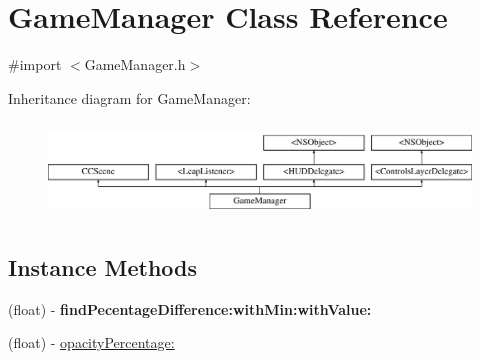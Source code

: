 \hypertarget{interface_game_manager}{\section{Game\-Manager Class Reference}
\label{d4/d94/interface_game_manager}
}


{\ttfamily \#import $<$Game\-Manager.\-h$>$}

Inheritance diagram for Game\-Manager\-:\begin{figure}[H]
\begin{center}
\leavevmode
\includegraphics[height=2.560976cm]{d4/d94/interface_game_manager}
\end{center}
\end{figure}
\subsection*{Instance Methods}
\begin{DoxyCompactItemize}
\item 
\hypertarget{interface_game_manager_a7071b8391346173da0beeac17ea27310}{(float) -\/ {\bfseries find\-Pecentage\-Difference\-:with\-Min\-:with\-Value\-:}}\label{d4/d94/interface_game_manager_a7071b8391346173da0beeac17ea27310}

\item 
(float) -\/ \hyperlink{interface_game_manager_a0acb835edfa002c4c66a92d02376bd0b}{opacity\-Percentage\-:}
\end{DoxyCompactItemize}
